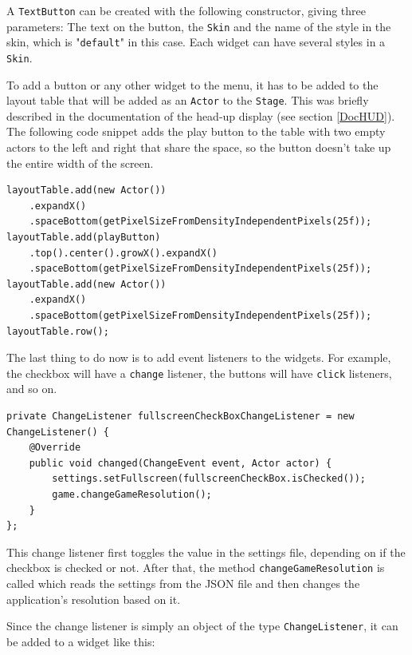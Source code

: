 \documentclass[12p]{article}
\begin{document}
A \texttt{TextButton} can be created with the following constructor, giving three parameters: The text on the button, the \texttt{Skin} and the name of the style in the skin, which is "\texttt{default}" in this case. Each widget can have several styles in a \texttt{Skin}.


To add a button or any other widget to the menu, it has to be added to the layout table that will be added as an \texttt{Actor} to the \texttt{Stage}. This was briefly described in the documentation of the head-up display (see section \ref{DocHUD}). The following code snippet adds the play button to the table with two empty actors to the left and right that share the space, so the button doesn't take up the entire width of the screen.

\begin{verbatim}
layoutTable.add(new Actor())
    .expandX()
    .spaceBottom(getPixelSizeFromDensityIndependentPixels(25f));
layoutTable.add(playButton)
    .top().center().growX().expandX()
    .spaceBottom(getPixelSizeFromDensityIndependentPixels(25f));
layoutTable.add(new Actor())
    .expandX()
    .spaceBottom(getPixelSizeFromDensityIndependentPixels(25f));
layoutTable.row();
\end{verbatim}

The last thing to do now is to add event listeners to the widgets. For example, the checkbox will have a \texttt{change} listener, the buttons will have \texttt{click} listeners, and so on.

\begin{verbatim}
private ChangeListener fullscreenCheckBoxChangeListener = new ChangeListener() {
    @Override
    public void changed(ChangeEvent event, Actor actor) {
        settings.setFullscreen(fullscreenCheckBox.isChecked());
        game.changeGameResolution();
    }
};
\end{verbatim}

This change listener first toggles the value in the settings file, depending on if the checkbox is checked or not. After that, the method \texttt{changeGameResolution} is called which reads the settings from the JSON file and then changes the application's resolution based on it.

Since the change listener is simply an object of the type \texttt{ChangeListener}, it can be added to a widget like this:

\end{document}
